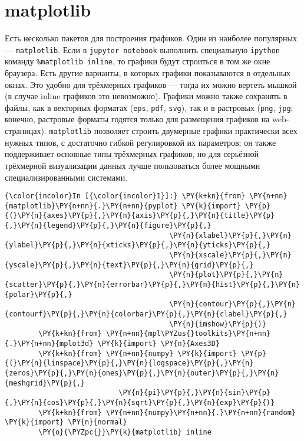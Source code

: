 \section{matplotlib}
\label{matplotlib}

Есть несколько пакетов для построения графиков. Один из наиболее
популярных --- \texttt{matplotlib}. Если в \texttt{jupyter\ notebook}
выполнить специальную \texttt{ipython} команду
\texttt{\%matplotlib\ inline}, то графики будут строиться в том же окне
браузера. Есть другие варианты, в которых графики показываются в
отдельных окнах. Это удобно для трёхмерных графиков --- тогда их можно
вертеть мышкой (в случае inline графиков это невозможно). Графики можно
также сохранять в файлы, как в векторных форматах (\texttt{eps},
\texttt{pdf}, \texttt{svg}), так и в растровых (\texttt{png},
\texttt{jpg}; конечно, растровые форматы годятся только для размещения
графиков на web-страницах). \texttt{matplotlib} позволяет строить
двумерные графики практически всех нужных типов, с достаточно гибкой
регулировкой их параметров; он также поддерживает основные типы
трёхмерных графиков, но для серьёзной трёхмерной визуализации данных
лучше пользоваться более мощными специализированными системами.

    \begin{Verbatim}[commandchars=\\\{\}]
{\color{incolor}In [{\color{incolor}1}]:} \PY{k+kn}{from} \PY{n+nn}{matplotlib}\PY{n+nn}{.}\PY{n+nn}{pyplot} \PY{k}{import} \PY{p}{(}\PY{n}{axes}\PY{p}{,}\PY{n}{axis}\PY{p}{,}\PY{n}{title}\PY{p}{,}\PY{n}{legend}\PY{p}{,}\PY{n}{figure}\PY{p}{,}
                                       \PY{n}{xlabel}\PY{p}{,}\PY{n}{ylabel}\PY{p}{,}\PY{n}{xticks}\PY{p}{,}\PY{n}{yticks}\PY{p}{,}
                                       \PY{n}{xscale}\PY{p}{,}\PY{n}{yscale}\PY{p}{,}\PY{n}{text}\PY{p}{,}\PY{n}{grid}\PY{p}{,}
                                       \PY{n}{plot}\PY{p}{,}\PY{n}{scatter}\PY{p}{,}\PY{n}{errorbar}\PY{p}{,}\PY{n}{hist}\PY{p}{,}\PY{n}{polar}\PY{p}{,}
                                       \PY{n}{contour}\PY{p}{,}\PY{n}{contourf}\PY{p}{,}\PY{n}{colorbar}\PY{p}{,}\PY{n}{clabel}\PY{p}{,}
                                       \PY{n}{imshow}\PY{p}{)}
        \PY{k+kn}{from} \PY{n+nn}{mpl\PYZus{}toolkits}\PY{n+nn}{.}\PY{n+nn}{mplot3d} \PY{k}{import} \PY{n}{Axes3D}
        \PY{k+kn}{from} \PY{n+nn}{numpy} \PY{k}{import} \PY{p}{(}\PY{n}{linspace}\PY{p}{,}\PY{n}{logspace}\PY{p}{,}\PY{n}{zeros}\PY{p}{,}\PY{n}{ones}\PY{p}{,}\PY{n}{outer}\PY{p}{,}\PY{n}{meshgrid}\PY{p}{,}
                           \PY{n}{pi}\PY{p}{,}\PY{n}{sin}\PY{p}{,}\PY{n}{cos}\PY{p}{,}\PY{n}{sqrt}\PY{p}{,}\PY{n}{exp}\PY{p}{)}
        \PY{k+kn}{from} \PY{n+nn}{numpy}\PY{n+nn}{.}\PY{n+nn}{random} \PY{k}{import} \PY{n}{normal}
        \PY{o}{\PYZpc{}}\PY{k}{matplotlib} inline
\end{Verbatim}

